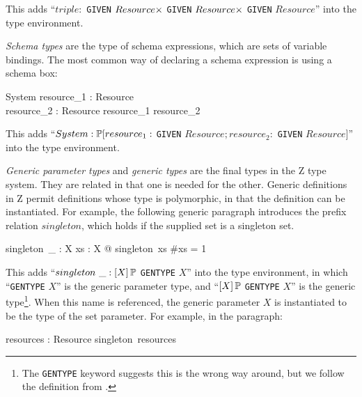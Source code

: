 This adds ``$triple : $ {\tt GIVEN}
$Resource \cross$ {\tt GIVEN} $Resource \cross$ {\tt GIVEN} $Resource$''
into the type environment.

{\em Schema types} are the type of schema expressions, which are sets
of variable bindings. The most common way of declaring a schema
expression is using a schema box:
\begin{schema}{System}
  resource_1 : Resource\\
  resource_2 : Resource
\where
  resource_1 \neq resource_2
\end{schema}

This adds ``$System
: \power [resource_1 : $ {\tt GIVEN} $Resource; resource_2 : $ {\tt GIVEN}
$Resource]$'' into the type environment.

{\em Generic parameter types} and {\em generic types} are the final
types in the Z type system. They are related in that one is needed for
the other. Generic definitions in Z permit definitions whose type is
polymorphic, in that the definition can be instantiated. For example,
the following generic paragraph introduces the prefix relation
$singleton$, which holds if the supplied set is a singleton set.
\begin{gendef}[X]
  singleton~\_ : \power X
\where
  \forall xs : \power X @ singleton~xs \iff \#xs = 1
\end{gendef}
%
%


This adds ``$singleton~\_ : [X] \power $ {\tt GENTYPE} $X$'' into the
type environment, in which ``{\tt GENTYPE} $X$'' is the generic
parameter type, and ``$[X] \power $ {\tt GENTYPE} $X$'' is the generic
type\footnote{The {\tt GENTYPE} keyword suggests this is the wrong way
around, but we follow the definition from .}. When this
name is referenced, the generic parameter $X$ is instantiated to be
the type of the set parameter. For example, in the paragraph:
\begin{axdef}
  resources : \power Resource
\where
  singleton~resources
\end{axdef}

